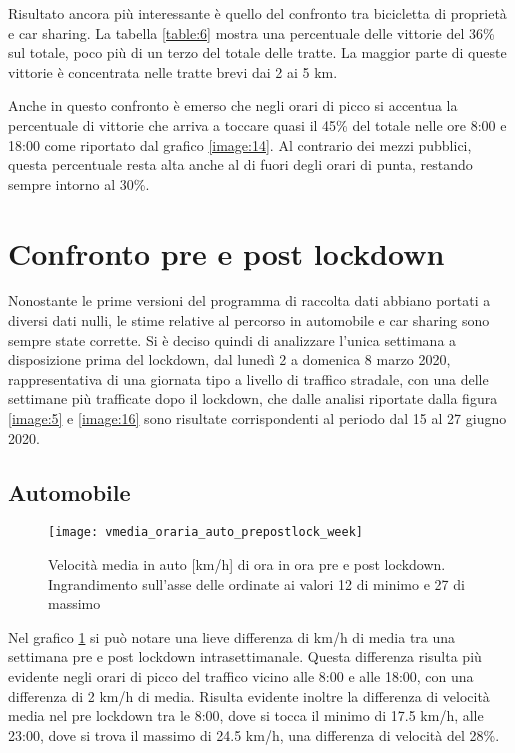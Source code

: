 Risultato ancora più interessante è quello del confronto tra bicicletta di proprietà e car sharing. La tabella \ref{table:6} mostra una percentuale delle vittorie del 36\% sul totale, poco più di un terzo del totale delle tratte. La maggior parte di queste vittorie è concentrata nelle tratte brevi dai 2 ai 5 km.

Anche in questo confronto è emerso che negli orari di picco si accentua la percentuale di vittorie che arriva a toccare quasi il 45\% del totale nelle ore 8:00 e 18:00 come riportato dal grafico \ref{image:14}. Al contrario dei mezzi pubblici, questa percentuale resta alta anche al di fuori degli orari di punta, restando sempre intorno al 30\%.

\section{Confronto pre e post lockdown}

Nonostante le prime versioni del programma di raccolta dati abbiano portati a diversi dati nulli, le stime relative al percorso in automobile e car sharing sono sempre state corrette. Si è deciso quindi di analizzare l'unica settimana a disposizione prima del lockdown, dal lunedì 2 a domenica 8 marzo 2020, rappresentativa di una giornata tipo a livello di traffico stradale, con una delle settimane più trafficate dopo il lockdown, che dalle analisi riportate dalla figura \ref{image:5} e \ref{image:16} sono risultate corrispondenti al periodo dal 15 al 27 giugno 2020.

\subsection{Automobile}

\begin{figure}[H]
	\texttt{[image: vmedia\_oraria\_auto\_prepostlock\_week]}
	\caption{Velocità media in auto [km/h] di ora in ora pre e post lockdown. Ingrandimento sull'asse delle ordinate ai valori 12 di minimo e 27 di massimo}
	\label{image:22}
\end{figure}

Nel grafico \ref{image:22} si può notare una lieve differenza di km/h di media tra una settimana pre e post lockdown intrasettimanale. Questa differenza risulta più evidente negli orari di picco del traffico vicino alle 8:00 e alle 18:00, con una differenza di 2 km/h di media. Risulta evidente inoltre la differenza di velocità media nel pre lockdown tra le 8:00, dove si tocca il minimo di 17.5 km/h, alle 23:00, dove si trova il massimo di 24.5 km/h, una differenza di velocità del 28\%.


